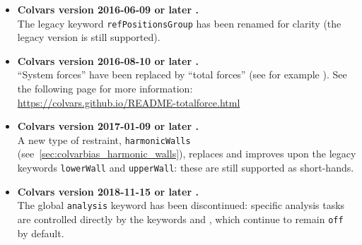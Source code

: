\begin{itemize}

\item \textbf{Colvars version 2016-06-09 or later .}\\
  The legacy keyword \texttt{refPositionsGroup} has been renamed  for clarity (the legacy version is still supported).

\item \textbf{Colvars version 2016-08-10 or later .}\\
  ``System forces'' have been replaced by ``total forces'' (see for example ).
  See the following page for more information:\\
  \url{https://colvars.github.io/README-totalforce.html}

\item \textbf{Colvars version 2017-01-09 or later .}\\
  A new type of restraint, \texttt{harmonicWalls} (see~\ref{sec:colvarbias_harmonic_walls}), replaces and improves upon the legacy keywords \texttt{lowerWall} and \texttt{upperWall}: these are still supported as short-hands.

\item \textbf{Colvars version 2018-11-15 or later .}\\
  The global \texttt{analysis} keyword has been discontinued: specific analysis tasks are controlled directly by the keywords  and , which continue to remain \texttt{off} by default.


\end{itemize}
